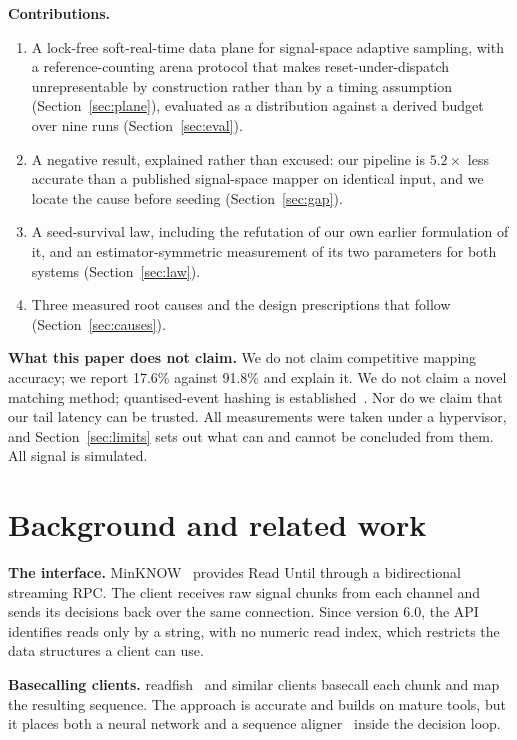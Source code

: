 \documentclass[conference]{IEEEtran}
\begin{document}
\textbf{Contributions.}
\begin{enumerate}
\item A lock-free soft-real-time data plane for signal-space adaptive sampling, with a
reference-counting arena protocol that makes reset-under-dispatch unrepresentable by
construction rather than by a timing assumption (Section~\ref{sec:plane}), evaluated as a
distribution against a derived budget over nine runs (Section~\ref{sec:eval}).
\item A negative result, explained rather than excused: our pipeline is $5.2\times$ less accurate
than a published signal-space mapper on identical input, and we locate the cause before
seeding (Section~\ref{sec:gap}).
\item A seed-survival law, including the refutation of our own earlier formulation of it, and
an estimator-symmetric measurement of its two parameters for both systems
(Section~\ref{sec:law}).
\item Three measured root causes and the design prescriptions that follow
(Section~\ref{sec:causes}).
\end{enumerate}

\textbf{What this paper does not claim.} We do not claim competitive mapping accuracy; we
report 17.6\% against 91.8\% and explain it. We do not claim a novel matching method;
quantised-event hashing is established~\cite{rawhash,rawhash2}. Nor do we claim that our tail
latency can be trusted. All measurements were taken under a hypervisor, and
Section~\ref{sec:limits} sets out what can and cannot be concluded from them. All signal is
simulated.

\section{Background and related work}

\textbf{The interface.} MinKNOW~\cite{minknow} provides Read Until through a bidirectional
streaming RPC. The client receives raw signal chunks from each channel and sends its decisions
back over the same connection. Since version 6.0, the API identifies reads only by a string, with
no numeric read index, which restricts the data structures a client can use.

\textbf{Basecalling clients.} readfish~\cite{readfish} and similar clients basecall each chunk
and map the resulting sequence. The approach is accurate and builds on mature tools, but it
places both a neural network and a sequence aligner~\cite{minimap2} inside the decision loop.
\end{document}
